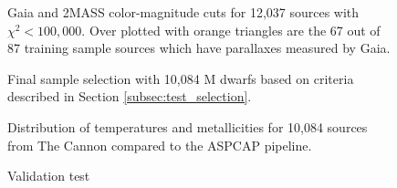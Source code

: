 \documentclass[preprint]{aastex62}
\begin{document}
\begin{figure}[ht]
\caption{Gaia and 2MASS color-magnitude cuts for 12,037 sources with $\chi^2<100,000$. Over plotted with orange triangles are the 67 out of 87 training sample sources which have parallaxes measured by Gaia. \label{fig:cmd_selection}}
\end{figure}

\begin{figure}[ht]
\caption{Final sample selection with 10,084 M dwarfs based on criteria described in Section \ref{subsec:test_selection}. \label{fig:safe_selection}}
\end{figure}

\begin{figure}[ht]
\caption{Distribution of temperatures and metallicities for 10,084 sources from The Cannon compared to the ASPCAP pipeline. \label{fig:aspcap_cannon_label_hist}}
\end{figure}

\begin{figure}[ht]
\caption{Validation test \label{fig:aspcap_cannon_validation}}
\end{figure}



\end{document}
